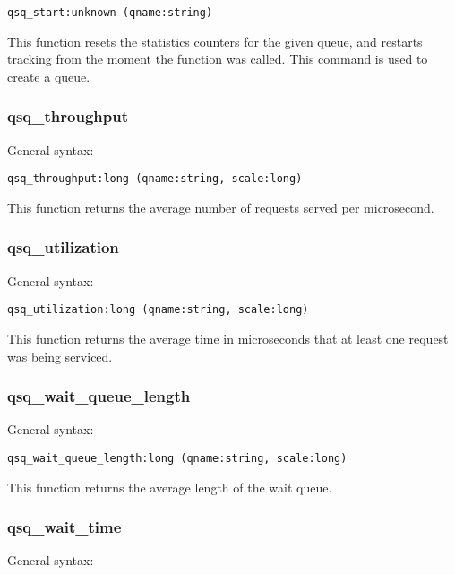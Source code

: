 \documentclass[twoside,english]{article}
\newenvironment{vindent}
{\begin{list}{}{\setlength{\listparindent}{6pt}}
\item[]}
{\end{list}}
\begin{document}
\begin{vindent}
\begin{verbatim}
qsq_start:unknown (qname:string)
\end{verbatim}
\end{vindent}
This function resets the statistics counters for the given queue, and restarts
tracking from the moment the function was called. This command is used to
create a queue.


\subsubsection{qsq\_throughput}
General syntax:

\begin{vindent}
\begin{verbatim}
qsq_throughput:long (qname:string, scale:long)
\end{verbatim}
\end{vindent}
This function returns the average number of requests served per microsecond.


\subsubsection{qsq\_utilization}
General syntax:

\begin{vindent}
\begin{verbatim}
qsq_utilization:long (qname:string, scale:long)
\end{verbatim}
\end{vindent}
This function returns the average time in microseconds that at least one
request was being serviced.


\subsubsection{qsq\_wait\_queue\_length}
General syntax:

\begin{vindent}
\begin{verbatim}
qsq_wait_queue_length:long (qname:string, scale:long)
\end{verbatim}
\end{vindent}
This function returns the average length of the wait queue.


\subsubsection{qsq\_wait\_time}
General syntax:
\end{document}
